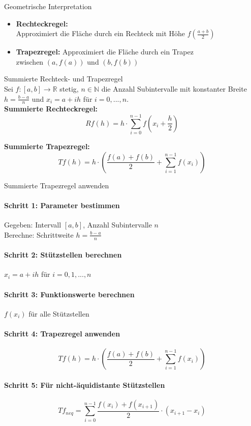 \begin{concept}{Geometrische Interpretation}
\begin{itemize}
    \item \textbf{Rechteckregel:} \\ Approximiert die Fläche durch ein Rechteck mit Höhe $f(\frac{a+b}{2})$
    \item \textbf{Trapezregel:} Approximiert die Fläche durch ein Trapez \\ zwischen $(a,f(a))$ und $(b,f(b))$
\end{itemize}
\end{concept}

\begin{theorem}{Summierte Rechteck- und Trapezregel}\\
Sei $f: [a,b] \rightarrow \mathbb{R}$ stetig, $n \in \mathbb{N}$ die Anzahl Subintervalle mit konstanter Breite $h = \frac{b-a}{n}$ und $x_i = a + ih$ für $i = 0, ..., n$.
\vspace{2mm}\\
\textbf{Summierte Rechteckregel:}
$$Rf(h) = h \cdot \sum_{i=0}^{n-1} f\left(x_i + \frac{h}{2}\right)$$

\textbf{Summierte Trapezregel:}
$$Tf(h) = h \cdot \left(\frac{f(a) + f(b)}{2} + \sum_{i=1}^{n-1} f(x_i)\right)$$
\end{theorem}

\begin{KR}{Summierte Trapezregel anwenden}
\paragraph{Schritt 1: Parameter bestimmen}
Gegeben: Intervall $[a,b]$, Anzahl Subintervalle $n$\\
Berechne: Schrittweite $h = \frac{b-a}{n}$

\paragraph{Schritt 2: Stützstellen berechnen}
$x_i = a + ih$ für $i = 0, 1, ..., n$

\paragraph{Schritt 3: Funktionswerte berechnen}
$f(x_i)$ für alle Stützstellen

\paragraph{Schritt 4: Trapezregel anwenden}
$$Tf(h) = h \cdot \left(\frac{f(a) + f(b)}{2} + \sum_{i=1}^{n-1} f(x_i)\right)$$

\paragraph{Schritt 5: Für nicht-äquidistante Stützstellen}
$$Tf_{neq} = \sum_{i=0}^{n-1} \frac{f(x_i) + f(x_{i+1})}{2} \cdot (x_{i+1} - x_i)$$
\end{KR}

